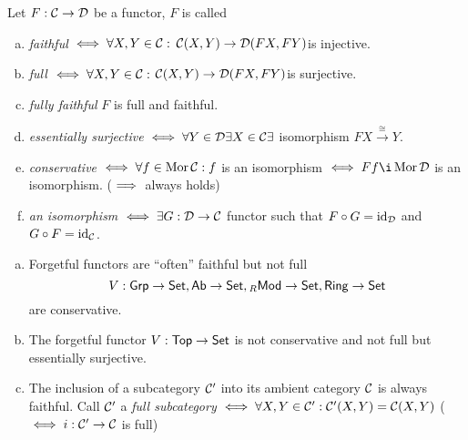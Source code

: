 \documentclass[a4paper]{report}
\begin{document}
\begin{defi}
  Let $F: \mathcal{C} \to \mathcal{D}$ be a functor, $F$ is called
  \begin{enumerate}[(a)]
    \item \emph{faithful} $\iff \forall X, Y \in \mathcal{C}:$
          \(\mathcal{C}(X,Y) \to \mathcal{D}(FX,FY)\)is injective.
    \item \emph{full} $\iff \forall X, Y \in \mathcal{C}:$
          \(\mathcal{C}(X,Y) \to \mathcal{D}(FX,FY)\)is surjective.
    \item \emph{fully faithful} $F$ is full and faithful.
    \item \emph{essentially surjective} $\iff \forall Y \in \mathcal{D} \exists X \in \mathcal{C} \exists$ isomorphism $FX \xrightarrow \cong Y$.
    \item \emph{conservative} $\iff \forall f \in \operatorname{Mor} \mathcal{C}: f$ is an isomorphism $\iff Ff \i \Mor \D$ is an isomorphism. ($\implies$ always holds)
\item \emph{an isomorphism} $\iff \exists G: \mathcal{D} \to \mathcal{C}$ functor such that $F \circ G = \operatorname{id}_{\mathcal{D}}$ and $G \circ F = \operatorname{id}_{\mathcal{C}}$.
  \end{enumerate}
\end{defi}
\begin{exmps*}
  \begin{enumerate}[(a)]
    \item Forgetful functors are ``often'' faithful but not full
          \[V: \mathsf{Grp} \to \mathsf{Set}, \mathsf{Ab} \to \mathsf{Set}, {_{R}}\mathsf{Mod} \to \mathsf{Set}, \mathsf{Ring} \to \mathsf{Set}\]
          are conservative.
    \item The forgetful functor $V: \mathsf{Top} \to \mathsf{Set}$ is not conservative and not full but essentially surjective.
          \item The inclusion of a subcategory $\mathcal{C}'$ into its ambient category $\mathcal{C}$ is always faithful. Call $\mathcal{C}'$ a \emph{full subcategory} $\iff \forall X, Y \in \mathcal{C}' : \mathcal{C}'(X,Y) = \mathcal{C}(X,Y)$ ($\iff i: \mathcal{C}' \to \mathcal{C}$ is full)
  \end{enumerate}
\end{exmps*}
\end{document}
